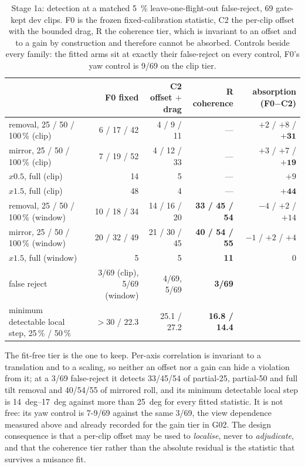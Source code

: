 \begin{table}[t]
\centering
\caption{Stage 1a: detection at a matched \SI{5}{\percent} leave-one-flight-out false-reject, 69
gate-kept dev clips. F0 is the frozen fixed-calibration statistic, C2 the per-clip offset with the
bounded drag, R the coherence tier, which is invariant to an offset and to a gain by construction
and therefore cannot be absorbed. Controls beside every family: the fitted arms sit at exactly
their false-reject on every control, F0's yaw control is \num{9}/69 on the clip tier.}
\label{tab:j-absorption}
\begin{tabular}{lrrrr}
\toprule
 & F0 fixed & C2 offset $+$ drag & R coherence & absorption (F0$-$C2) \\
\midrule
removal, 25 / 50 / 100\,\% (clip) & 6 / 17 / 42 & 4 / 9 / 11 & --- & $+2$ / $+8$ / $\mathbf{+31}$ \\
mirror, 25 / 50 / 100\,\% (clip) & 7 / 19 / 52 & 4 / 12 / 33 & --- & $+3$ / $+7$ / $\mathbf{+19}$ \\
$x0.5$, full (clip) & 14 & 5 & --- & $+9$ \\
$x1.5$, full (clip) & 48 & 4 & --- & $\mathbf{+44}$ \\
\midrule
removal, 25 / 50 / 100\,\% (window) & 10 / 18 / 34 & 14 / 16 / 20 & \textbf{33 / 45 / 54} & $-4$ / $+2$ / $+14$ \\
mirror, 25 / 50 / 100\,\% (window) & 20 / 32 / 49 & 21 / 30 / 45 & \textbf{40 / 54 / 55} & $-1$ / $+2$ / $+4$ \\
$x1.5$, full (window) & 5 & 5 & \textbf{11} & $0$ \\
\midrule
false reject & 3/69 (clip), 5/69 (window) & 4/69, 5/69 & \textbf{3/69} & \\
minimum detectable local step, 25\,\% / 50\,\% & $>30$ / \num{22.3} & \num{25.1} / \num{27.2} & \textbf{\num{16.8} / \num{14.4}} & \\
\bottomrule
\end{tabular}
\end{table}

The fit-free tier is the one to keep. Per-axis correlation is invariant to a translation and to a
scaling, so neither an offset nor a gain can hide a violation from it; at a \num{3}/69 false-reject
it detects \num{33}/\num{45}/\num{54} of partial-25, partial-50 and full tilt removal and
\num{40}/\num{54}/\num{55} of mirrored roll, and its minimum detectable local step is
\SIrange{14}{17}{deg} against more than \SI{25}{deg} for every fitted statistic. It is not free: its
yaw control is \num{7}-\num{9}/69 against the same \num{3}/69, the view dependence measured above and
already recorded for the gain tier in G02. The design consequence is that a per-clip offset may be
used to \emph{localise}, never to \emph{adjudicate}, and that the coherence tier rather than the
absolute residual is the statistic that survives a nuisance fit.

